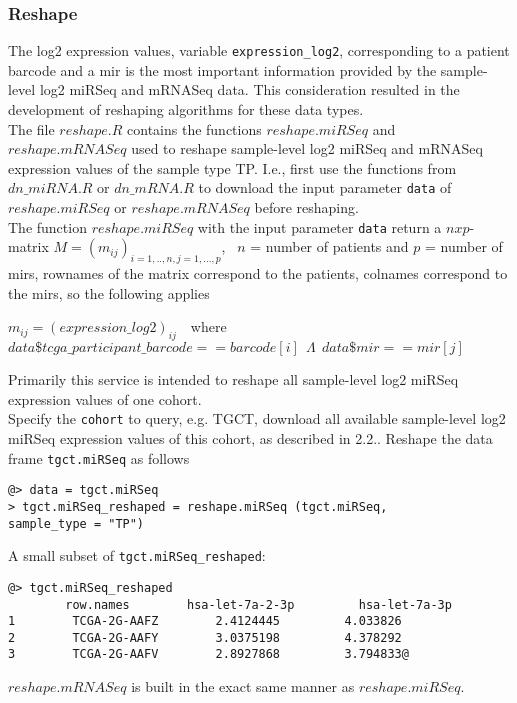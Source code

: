 \documentclass{TechReport}
\begin{document}
\subsubsection{Reshape}
The log2 expression values, variable {\tt expression\_log2}, corresponding to a
patient barcode and a mir is the most important information provided by 
the sample-level log2 miRSeq and mRNASeq data. This consideration resulted in the
development of reshaping algorithms for these data types. \\
The file $reshape.R$ contains the functions $reshape.miRSeq$ and $reshape.mRNASeq$
used to reshape sample-level log2 miRSeq and mRNASeq 
expression values of the sample type TP. I.e., first use the functions from 
$dn\_miRNA.R$ or $dn\_mRNA.R$ to download the input parameter {\tt data}
of $reshape.miRSeq$ or $reshape.mRNASeq$ before reshaping. \\
The function $reshape.miRSeq$ with the input parameter {\tt data} return a
$nxp$-matrix $M = (m_{ij})_{i=1,..,n, j=1,...,p}$, \ $n$ = number of patients and 
$p$ = number of mirs, rownames of the matrix correspond to the patients, colnames
correspond to the mirs,  so the following applies
\begin{center}
$m_{ij}= (expression\_log2)_{ij}$\ \  where \\
$data\$tcga\_participant\_barcode==barcode[i]\ \  \Lambda\ \ data\$mir==mir[j] $
\end{center}
Primarily this service is intended to reshape all sample-level log2 miRSeq
expression values of one cohort. \\
Specify the {\tt cohort} to query, e.g. TGCT, download all available sample-level
log2 miRSeq expression values of this cohort, as described 
in 2.2..
Reshape the data frame {\tt tgct.miRSeq} as follows
\begin{lstlisting}[style=base]
@> data = tgct.miRSeq
> tgct.miRSeq_reshaped = reshape.miRSeq (tgct.miRSeq, 
sample_type = "TP")
\end{lstlisting}
A small subset of {\tt tgct.miRSeq\_reshaped}:
\begin{lstlisting}[style=base]
@> tgct.miRSeq_reshaped
        row.names        hsa-let-7a-2-3p         hsa-let-7a-3p
1        TCGA-2G-AAFZ        2.4124445         4.033826
2        TCGA-2G-AAFY        3.0375198         4.378292
3        TCGA-2G-AAFV        2.8927868         3.794833@
\end{lstlisting}
$reshape.mRNASeq$ is built in the exact same manner as $reshape.miRSeq$.
\end{document}
